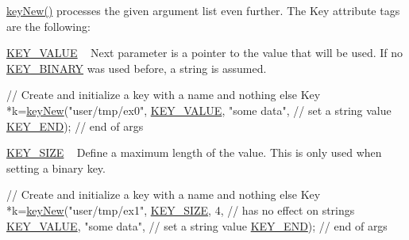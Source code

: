 \hyperlink{group__key_gad23c65b44bf48d773759e1f9a4d43b89}{key\+New()} processes the given argument list even further. The Key attribute tags are the following\+:
\begin{DoxyItemize}
\item \hyperlink{group__key_gga91fb3178848bd682000958089abbaf40ac66e4a49d09212b79f5754ca6db5bd2e}{K\+E\+Y\+\_\+\+V\+A\+L\+UE} ~\newline
 Next parameter is a pointer to the value that will be used. If no \hyperlink{group__key_gga91fb3178848bd682000958089abbaf40a1ca18d4e094ae7487d35ecedda2235ff}{K\+E\+Y\+\_\+\+B\+I\+N\+A\+RY} was used before, a string is assumed. 
\begin{DoxyCodeInclude}
\textcolor{comment}{// Create and initialize a key with a name and nothing else}
Key *k=\hyperlink{group__key_gad23c65b44bf48d773759e1f9a4d43b89}{keyNew}(\textcolor{stringliteral}{"user/tmp/ex0"},
        \hyperlink{group__key_gga91fb3178848bd682000958089abbaf40ac66e4a49d09212b79f5754ca6db5bd2e}{KEY\_VALUE}, \textcolor{stringliteral}{"some data"},    \textcolor{comment}{// set a string value}
        \hyperlink{group__key_gga91fb3178848bd682000958089abbaf40aa8adb6fcb92dec58fb19410eacfdd403}{KEY\_END});                  \textcolor{comment}{// end of args}
\end{DoxyCodeInclude}

\item \hyperlink{group__key_gga91fb3178848bd682000958089abbaf40a6d531b5c41445d19d0452eebdccbfa01}{K\+E\+Y\+\_\+\+S\+I\+ZE} ~\newline
 Define a maximum length of the value. This is only used when setting a binary key. 
\begin{DoxyCodeInclude}
\textcolor{comment}{// Create and initialize a key with a name and nothing else}
Key *k=\hyperlink{group__key_gad23c65b44bf48d773759e1f9a4d43b89}{keyNew}(\textcolor{stringliteral}{"user/tmp/ex1"},
        \hyperlink{group__key_gga91fb3178848bd682000958089abbaf40a6d531b5c41445d19d0452eebdccbfa01}{KEY\_SIZE}, 4,               \textcolor{comment}{// has no effect on strings}
        \hyperlink{group__key_gga91fb3178848bd682000958089abbaf40ac66e4a49d09212b79f5754ca6db5bd2e}{KEY\_VALUE}, \textcolor{stringliteral}{"some data"},    \textcolor{comment}{// set a string value}
        \hyperlink{group__key_gga91fb3178848bd682000958089abbaf40aa8adb6fcb92dec58fb19410eacfdd403}{KEY\_END});                  \textcolor{comment}{// end of args}
\end{DoxyCodeInclude}


\end{DoxyItemize}
